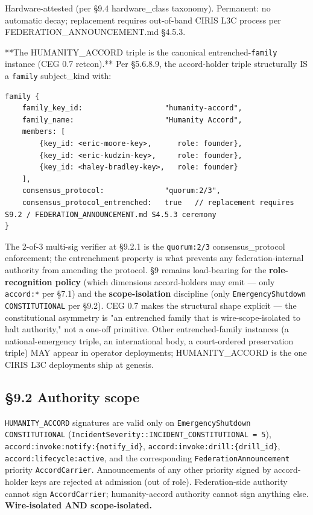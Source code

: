 \documentclass[11pt]{article}
\begin{document}
Hardware-attested (per §9.4 hardware\_class taxonomy). Permanent: no automatic decay; replacement requires out-of-band CIRIS L3C process per FEDERATION\_ANNOUNCEMENT.md §4.5.3.


**The HUMANITY\_ACCORD triple is the canonical entrenched-\texttt{family} instance (CEG 0.7 retcon).** Per §5.6.8.9, the accord-holder triple structurally IS a \texttt{family} subject\_kind with:


\begin{lstlisting}
family {
    family_key_id:                   "humanity-accord",
    family_name:                     "Humanity Accord",
    members: [
        {key_id: <eric-moore-key>,      role: founder},
        {key_id: <eric-kudzin-key>,     role: founder},
        {key_id: <haley-bradley-key>,   role: founder}
    ],
    consensus_protocol:              "quorum:2/3",
    consensus_protocol_entrenched:   true   // replacement requires S9.2 / FEDERATION_ANNOUNCEMENT.md S4.5.3 ceremony
}
\end{lstlisting}

The 2-of-3 multi-sig verifier at §9.2.1 is the \texttt{quorum:2/3} consensus\_protocol enforcement; the entrenchment property is what prevents any federation-internal authority from amending the protocol. §9 remains load-bearing for the \textbf{role-recognition policy} (which dimensions accord-holders may emit — only \texttt{accord:*} per §7.1) and the \textbf{scope-isolation} discipline (only \texttt{EmergencyShutdown CONSTITUTIONAL} per §9.2). CEG 0.7 makes the structural shape explicit — the constitutional asymmetry is "an entrenched family that is wire-scope-isolated to halt authority," not a one-off primitive. Other entrenched-family instances (a national-emergency triple, an international body, a court-ordered preservation triple) MAY appear in operator deployments; HUMANITY\_ACCORD is the one CIRIS L3C deployments ship at genesis.


\subsection*{§9.2 Authority scope}


\texttt{HUMANITY\_ACCORD} signatures are valid only on \texttt{EmergencyShutdown CONSTITUTIONAL} (\texttt{IncidentSeverity::INCIDENT\_CONSTITUTIONAL = 5}), \texttt{accord:invoke:notify:\{notify\_id\}}, \texttt{accord:invoke:drill:\{drill\_id\}}, \texttt{accord:lifecycle:active}, and the corresponding \texttt{FederationAnnouncement} priority \texttt{AccordCarrier}. Announcements of any other priority signed by accord-holder keys are rejected at admission (out of role). Federation-side authority cannot sign \texttt{AccordCarrier}; humanity-accord authority cannot sign anything else. \textbf{Wire-isolated AND scope-isolated.}
\end{document}
